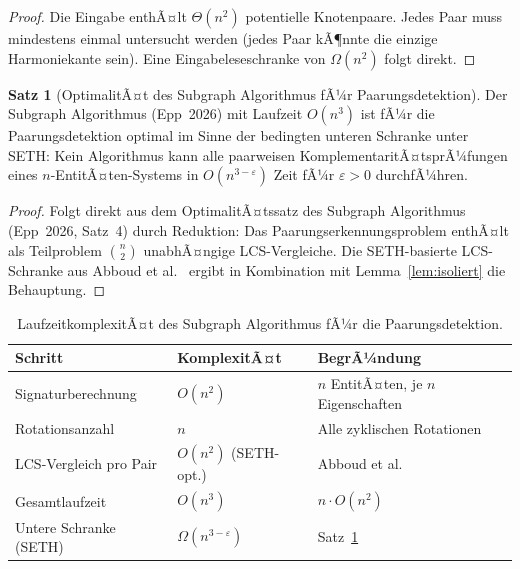 ﻿\documentclass[a4paper,12pt]{article}
\theoremstyle{definition}
\newtheorem{satz}{Satz}
\begin{document}
\begin{proof}
	Die Eingabe enthÃ¤lt $\Theta(n^2)$ potentielle Knotenpaare. Jedes Paar muss mindestens
	einmal untersucht werden (jedes Paar kÃ¶nnte die einzige Harmoniekante sein).
	Eine Eingabeleseschranke von $\Omega(n^2)$ folgt direkt.
\end{proof}

\begin{satz}[OptimalitÃ¤t des Subgraph Algorithmus fÃ¼r Paarungsdetektion]
	\label{satz:opt_paar}
	Der Subgraph Algorithmus (Epp~2026) mit Laufzeit $O(n^3)$ ist fÃ¼r die
	Paarungsdetektion optimal im Sinne der bedingten unteren Schranke unter SETH:
	Kein Algorithmus kann alle paarweisen KomplementaritÃ¤tsprÃ¼fungen eines
	$n$-EntitÃ¤ten-Systems in $O(n^{3-\varepsilon})$ Zeit fÃ¼r $\varepsilon > 0$
	durchfÃ¼hren.
\end{satz}

\begin{proof}
	Folgt direkt aus dem OptimalitÃ¤tssatz des Subgraph Algorithmus (Epp~2026, Satz~4)
	durch Reduktion: Das Paarungserkennungsproblem enthÃ¤lt als Teilproblem
	$\binom{n}{2}$ unabhÃ¤ngige LCS-Vergleiche. Die SETH-basierte
	LCS-Schranke aus Abboud et al.~\cite{abboud2015} ergibt in Kombination
	mit Lemma~\ref{lem:isoliert} die Behauptung.
\end{proof}

\begin{table}[h]
	\centering
	\caption{LaufzeitkomplexitÃ¤t des Subgraph Algorithmus fÃ¼r die Paarungsdetektion.}
	\label{tab:komplexitaet}
	\renewcommand{\arraystretch}{1.25}
	\begin{tabular}{lll}
		\toprule
		\textbf{Schritt} & \textbf{KomplexitÃ¤t} & \textbf{BegrÃ¼ndung} \\
		\midrule
		Signaturberechnung       & $O(n^2)$         & $n$ EntitÃ¤ten, je $n$ Eigenschaften \\
		Rotationsanzahl          & $n$              & Alle zyklischen Rotationen \\
		LCS-Vergleich pro Pair   & $O(n^2)$ (SETH-opt.) & Abboud et al.~\cite{abboud2015} \\
		Gesamtlaufzeit           & $O(n^3)$         & $n \cdot O(n^2)$ \\
		Untere Schranke (SETH)   & $\Omega(n^{3-\varepsilon})$ & Satz~\ref{satz:opt_paar} \\
		\bottomrule
	\end{tabular}
\end{table}

\end{document}
